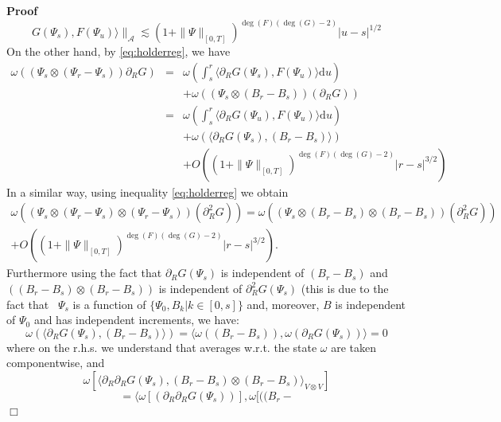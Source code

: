 \documentclass[11pt]{article}
\newcommand{\mathd}{\mathrm{d}}
\newcommand{\nobracket}{}
\newenvironment{proof}{\noindent\textbf{Proof\ }}{\hspace*{\fill}$\Box$\medskip}
\begin{document}
\begin{proof}
\begin{equation}
    G (\Psi_s), F (\Psi_u) \rangle \|_{\mathcal{A}} \lesssim (1 + \| \Psi
    \|_{[0, T]})^{\deg (F) (\deg (G) - 2)} | u - s |^{1 / 2}
    \label{eq:holderreg3}
  \end{equation}
  On the other hand, by {\eqref{eq:holderreg}}, we have
  \begin{equation}
    \begin{array}{lll}
      \omega ((\Psi_s \otimes (\Psi_r - \Psi_s)) \partial_R G) & = & \omega
      \left( \int_s^r \langle \partial_R G (\Psi_s), F (\Psi_u) \rangle \mathd
      u \right)\\
      &  & + \omega ((\Psi_s \otimes (B_r - B_s)) (\partial_R G))\\
      & = & \omega \left( \int_s^r \langle \partial_R G (\Psi_u), F (\Psi_u)
      \rangle \mathd u \right)\\
      &  & + \omega (\langle \partial_R G (\Psi_s), (B_r - B_s) \rangle)\\
      &  & + O ((1 + \| \Psi \|_{[0, T]})^{\deg (F) (\deg (G) - 2)} | r - s
      |^{3 / 2})
    \end{array} \label{eq:holderreg4}
  \end{equation}
  In a similar way, using inequality {\eqref{eq:holderreg}} we obtain
  \begin{equation}
    \begin{array}{c}
      \omega ((\Psi_s \otimes (\Psi_r - \Psi_s) \otimes (\Psi_r - \Psi_s))
      (\partial_R^2 G)) = \omega ((\Psi_s \otimes (B_r - B_s) \otimes (B_r -
      B_s)) (\partial_R^2 G))\\
      + O ((1 + \| \Psi \|_{[0, T]})^{\deg (F) (\deg (G) - 2)} | r - s |^{3 /
      2}) .
    \end{array}
  \end{equation}
  Furthermore using the fact that $\partial_R G (\Psi_s)$ is independent of
  $(B_r - B_s)$ and $((B_r - B_s) \otimes (B_r - B_s))$ is independent of
  $\partial_R^2 G (\Psi_s)$ (this is due to the fact that \ $\Psi_s$ is a
  function of $\nobracket \{ \Psi_0, B_k | \nobracket \nobracket k \in [0, s]
  \}$ and, moreover, $B$ is independent of $\Psi_0$ and has independent
  increments, we have:
  \[ \omega (\langle \partial_R G (\Psi_s), (B_r - B_s) \rangle) = \langle
     \omega ((B_r - B_s)), \omega (\partial_R G (\Psi_s)) \rangle = 0 \]
  where on the r.h.s. we understand that averages w.r.t. the state $\omega$
  are taken componentwise, and
  \[ \omega [\langle \partial_R \partial_R G (\Psi_s), (B_r - B_s) \otimes
     (B_r - B_s) \rangle_{V \otimes V}] \]
  \[ = \langle \omega [(\partial_R \partial_R G (\Psi_s))], \omega [((B_r -
\]
\end{proof}
\end{document}
